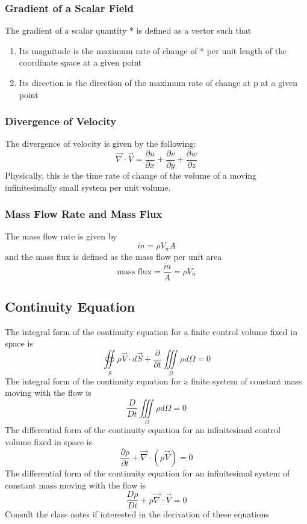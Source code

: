 \documentclass[11pt]{article}
\begin{document}
\subsubsection{Gradient of a Scalar Field}
The gradient of a scalar quantity * is defined as a vector such that
\begin{enumerate}
\item Its magnitude is the maximum rate of change of * per unit length of the coordinate space at a given point
\item Its direction is the direction of the maximum rate of change at p at a given point
\end{enumerate}

\subsubsection{Divergence of Velocity}
The divergence of velocity is given by the following:
$$ \vec{\nabla} \cdot \vec{V} = \frac{\partial u}{\partial x} + \frac{\partial v}{\partial y} + \frac{\partial w}{\partial z} $$
Physically, this is the time rate of change of the volume of a moving infinitesimally small system per unit volume. 

\subsubsection{Mass Flow Rate and Mass Flux}
The mass flow rate is given by 
$$ \dot{m} = \rho V_n A $$
and the mass flux is defined as the mass flow per unit area
$$ \text{mass flux} = \frac{\dot{m}}{A} = \rho V_n$$

\subsection{Continuity Equation}
The integral form of the continuity equation for a finite control volume fixed in space is 
$$\oiint \limits_S \rho \vec{V} \cdot d\vec{S} + \frac{\partial}{\partial t} \iiint \limits_{\Omega} \rho d\Omega = 0 $$
The integral form of the continuity equation for a finite system of constant mass moving with the flow is 
$$\frac{D}{D t} \iiint \limits_{\Omega} \rho d\Omega = 0 $$
The differential form of the continuity equation for an infinitesimal control volume fixed in space is 
$$ \frac{\partial \rho}{\partial t} + \vec{\nabla} \cdot (\rho \vec{V}) = 0$$
The differential form of the continuity equation for an infinitesimal system of constant mass moving with the flow is 
$$ \frac{D \rho}{Dt} + \rho \vec{\nabla} \cdot \vec{V} = 0$$
Consult the class notes if interested in the derivation of these equations
\end{document}
